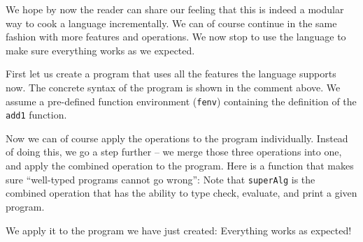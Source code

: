 We hope by now the reader can share our feeling that this is indeed a modular
way to cook a language incrementally. We can of course continue in the same
fashion with more features and operations. We now stop to use the language to
make sure everything works as we expected.

First let us create a program that uses all the features the language supports
now.
The concrete syntax of the program is shown in the comment above. We assume a
pre-defined function environment (\lstinline{fenv}) containing the definition of
the \lstinline{add1} function.

Now we can of course apply the operations to the program individually. Instead
of doing this, we go a step further -- we merge those three operations into one,
and apply the combined operation to the program. Here is a function that makes
sure ``well-typed programs cannot go wrong'':
Note that \lstinline{superAlg} is the combined operation that has the ability to
type check, evaluate, and print a given program.

We apply it to the program we have just created:
Everything works as expected!
